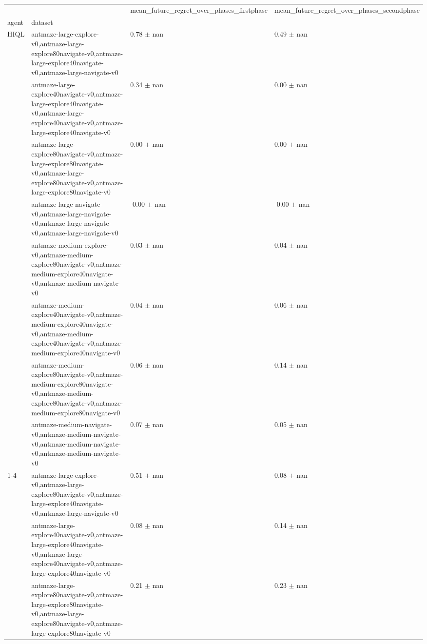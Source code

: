 \begin{tabular}{llll}
\toprule
 &  & mean_future_regret_over_phases_firstphase & mean_future_regret_over_phases_secondphase \\
agent & dataset &  &  \\
\midrule
\multirow[t]{8}{*}{HIQL} & antmaze-large-explore-v0,antmaze-large-explore80navigate-v0,antmaze-large-explore40navigate-v0,antmaze-large-navigate-v0 & 0.78 $\pm$ nan & 0.49 $\pm$ nan \\
 & antmaze-large-explore40navigate-v0,antmaze-large-explore40navigate-v0,antmaze-large-explore40navigate-v0,antmaze-large-explore40navigate-v0 & 0.34 $\pm$ nan & 0.00 $\pm$ nan \\
 & antmaze-large-explore80navigate-v0,antmaze-large-explore80navigate-v0,antmaze-large-explore80navigate-v0,antmaze-large-explore80navigate-v0 & 0.00 $\pm$ nan & 0.00 $\pm$ nan \\
 & antmaze-large-navigate-v0,antmaze-large-navigate-v0,antmaze-large-navigate-v0,antmaze-large-navigate-v0 & -0.00 $\pm$ nan & -0.00 $\pm$ nan \\
 & antmaze-medium-explore-v0,antmaze-medium-explore80navigate-v0,antmaze-medium-explore40navigate-v0,antmaze-medium-navigate-v0 & 0.03 $\pm$ nan & 0.04 $\pm$ nan \\
 & antmaze-medium-explore40navigate-v0,antmaze-medium-explore40navigate-v0,antmaze-medium-explore40navigate-v0,antmaze-medium-explore40navigate-v0 & 0.04 $\pm$ nan & 0.06 $\pm$ nan \\
 & antmaze-medium-explore80navigate-v0,antmaze-medium-explore80navigate-v0,antmaze-medium-explore80navigate-v0,antmaze-medium-explore80navigate-v0 & 0.06 $\pm$ nan & 0.14 $\pm$ nan \\
 & antmaze-medium-navigate-v0,antmaze-medium-navigate-v0,antmaze-medium-navigate-v0,antmaze-medium-navigate-v0 & 0.07 $\pm$ nan & 0.05 $\pm$ nan \\
\cline{1-4}
\multirow[t]{8}{*}{QRL} & antmaze-large-explore-v0,antmaze-large-explore80navigate-v0,antmaze-large-explore40navigate-v0,antmaze-large-navigate-v0 & 0.51 $\pm$ nan & 0.08 $\pm$ nan \\
 & antmaze-large-explore40navigate-v0,antmaze-large-explore40navigate-v0,antmaze-large-explore40navigate-v0,antmaze-large-explore40navigate-v0 & 0.08 $\pm$ nan & 0.14 $\pm$ nan \\
 & antmaze-large-explore80navigate-v0,antmaze-large-explore80navigate-v0,antmaze-large-explore80navigate-v0,antmaze-large-explore80navigate-v0 & 0.21 $\pm$ nan & 0.23 $\pm$ nan \\

\end{tabular}
